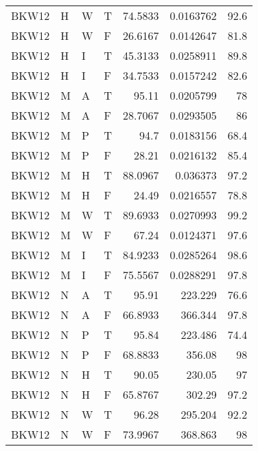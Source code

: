 \begin{longtable}{llllrrr}
    BKW12    & H     & W     & T          & 74.5833    & 0.0163762   & 92.6     \\
    BKW12    & H     & W     & F          & 26.6167    & 0.0142647   & 81.8     \\
    BKW12    & H     & I     & T          & 45.3133    & 0.0258911   & 89.8     \\
    BKW12    & H     & I     & F          & 34.7533    & 0.0157242   & 82.6     \\
    BKW12    & M     & A     & T          & 95.11      & 0.0205799   & 78       \\
    BKW12    & M     & A     & F          & 28.7067    & 0.0293505   & 86       \\
    BKW12    & M     & P     & T          & 94.7       & 0.0183156   & 68.4     \\
    BKW12    & M     & P     & F          & 28.21      & 0.0216132   & 85.4     \\
    BKW12    & M     & H     & T          & 88.0967    & 0.036373    & 97.2     \\
    BKW12    & M     & H     & F          & 24.49      & 0.0216557   & 78.8     \\
    BKW12    & M     & W     & T          & 89.6933    & 0.0270993   & 99.2     \\
    BKW12    & M     & W     & F          & 67.24      & 0.0124371   & 97.6     \\
    BKW12    & M     & I     & T          & 84.9233    & 0.0285264   & 98.6     \\
    BKW12    & M     & I     & F          & 75.5567    & 0.0288291   & 97.8     \\
    BKW12    & N     & A     & T          & 95.91      & 223.229     & 76.6     \\
    BKW12    & N     & A     & F          & 66.8933    & 366.344     & 97.8     \\
    BKW12    & N     & P     & T          & 95.84      & 223.486     & 74.4     \\
    BKW12    & N     & P     & F          & 68.8833    & 356.08      & 98       \\
    BKW12    & N     & H     & T          & 90.05      & 230.05      & 97       \\
    BKW12    & N     & H     & F          & 65.8767    & 302.29      & 97.2     \\
    BKW12    & N     & W     & T          & 96.28      & 295.204     & 92.2     \\
    BKW12    & N     & W     & F          & 73.9967    & 368.863     & 98       \\

\end{longtable}
